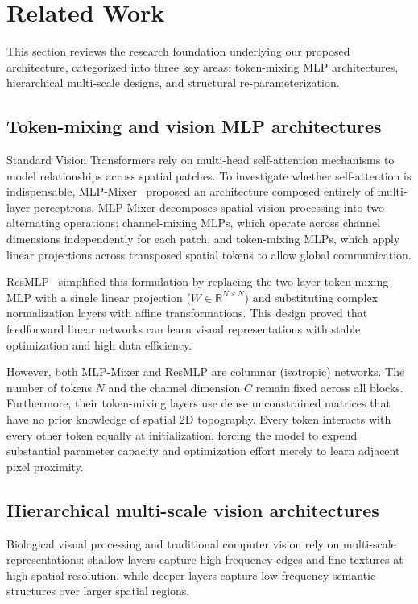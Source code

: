 \section{Related Work}
\label{section:related_work}

This section reviews the research foundation underlying our proposed architecture, categorized into three key areas: token-mixing MLP architectures, hierarchical multi-scale designs, and structural re-parameterization.

\subsection{Token-mixing and vision MLP architectures}
\label{subsection:vision_mlps}
Standard Vision Transformers rely on multi-head self-attention mechanisms to model relationships across spatial patches. To investigate whether self-attention is indispensable, MLP-Mixer~\cite{tolstikhin2021mlp} proposed an architecture composed entirely of multi-layer perceptrons. MLP-Mixer decomposes spatial vision processing into two alternating operations: channel-mixing MLPs, which operate across channel dimensions independently for each patch, and token-mixing MLPs, which apply linear projections across transposed spatial tokens to allow global communication.

ResMLP~\cite{touvron2021resmlp} simplified this formulation by replacing the two-layer token-mixing MLP with a single linear projection ($W \in \mathbb{R}^{N \times N}$) and substituting complex normalization layers with affine transformations. This design proved that feedforward linear networks can learn visual representations with stable optimization and high data efficiency.

However, both MLP-Mixer and ResMLP are columnar (isotropic) networks. The number of tokens $N$ and the channel dimension $C$ remain fixed across all blocks. Furthermore, their token-mixing layers use dense unconstrained matrices that have no prior knowledge of spatial 2D topography. Every token interacts with every other token equally at initialization, forcing the model to expend substantial parameter capacity and optimization effort merely to learn adjacent pixel proximity.

\subsection{Hierarchical multi-scale vision architectures}
\label{subsection:hierarchical_architectures}
Biological visual processing and traditional computer vision rely on multi-scale representations: shallow layers capture high-frequency edges and fine textures at high spatial resolution, while deeper layers capture low-frequency semantic structures over larger spatial regions.

